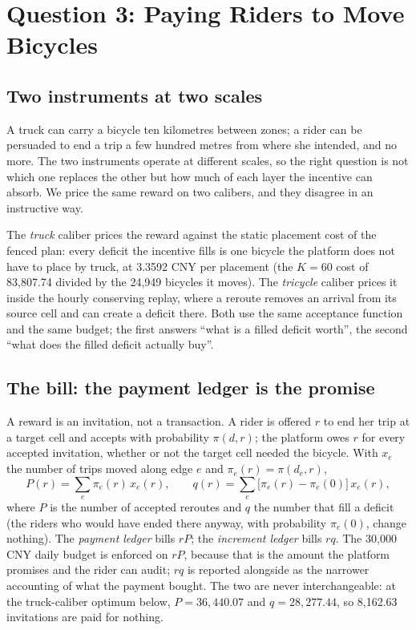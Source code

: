 \section{Question 3: Paying Riders to Move Bicycles}\label{sec:q3}

\subsection{Two instruments at two scales}

A truck can carry a bicycle ten kilometres between zones; a rider can be persuaded to
end a trip a few hundred metres from where she intended, and no more. The two
instruments operate at different scales, so the right question is not which one
replaces the other but how much of each layer the incentive can absorb. We price the
same reward on two calibers, and they disagree in an instructive way.

The \emph{truck} caliber prices the reward against the static placement cost of the
fenced plan: every deficit the incentive fills is one bicycle the platform does not
have to place by truck, at 3.3592 CNY per placement (the $K=60$ cost of 83,807.74
divided by the 24,949 bicycles it moves). The \emph{tricycle} caliber prices it inside
the hourly conserving replay, where a reroute removes an arrival from its source cell
and can create a deficit there. Both use the same acceptance function and the same
budget; the first answers ``what is a filled deficit worth'', the second ``what does
the filled deficit actually buy''.

\subsection{The bill: the payment ledger is the promise}

A reward is an invitation, not a transaction. A rider is offered $r$ to end her trip at
a target cell and accepts with probability $\pi(d,r)$; the platform owes $r$ for every
accepted invitation, whether or not the target cell needed the bicycle. With $x_e$ the
number of trips moved along edge $e$ and $\pi_e(r)=\pi(d_e,r)$,
\begin{equation}
P(r)=\sum_e \pi_e(r)\,x_e(r),\qquad
q(r)=\sum_e \bigl[\pi_e(r)-\pi_e(0)\bigr]\,x_e(r),
\label{eq:ledgers}
\end{equation}
where $P$ is the number of accepted reroutes and $q$ the number that fill a deficit
(the riders who would have ended there anyway, with probability $\pi_e(0)$, change
nothing). The \emph{payment ledger} bills $rP$; the \emph{increment ledger} bills $rq$.
The 30,000 CNY daily budget is enforced on $rP$, because that is the amount the
platform promises and the rider can audit; $rq$ is reported alongside as the narrower
accounting of what the payment bought. The two are never interchangeable:
at the truck-caliber optimum below, $P=36{,}440.07$ and $q=28{,}277.44$, so 8,162.63
invitations are paid for nothing.

